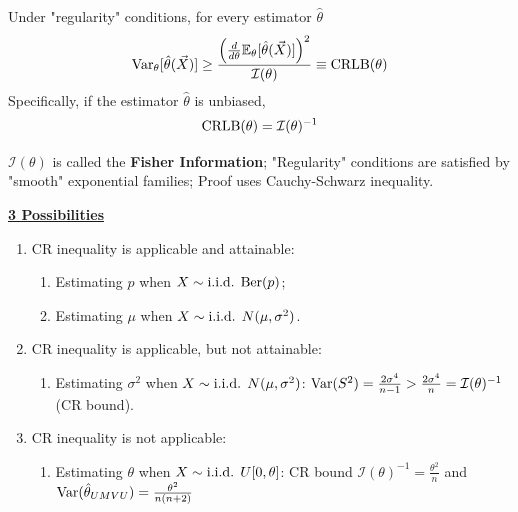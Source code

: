 \documentclass[11pt]{elegantbook}
\begin{document}
\begin{proposition}
    Under "regularity" conditions, for every estimator $\hat{\theta}$
    \begin{equation}
        \begin{aligned}
            \textnormal{Var}_\theta[\hat{\theta}(\vec{X})]\geq \frac{\left(\frac{d}{d\theta}\mathbb{E}_\theta[\hat{\theta}(\vec{X})]\right)^2}{\mathcal{I}(\theta)}\equiv \textnormal{CRLB}(\theta)
        \end{aligned}
        \nonumber
    \end{equation}
    Specifically, if the estimator $\hat{\theta}$ is unbiased, $$\textnormal{CRLB}(\theta)=\mathcal{I}(\theta)^{-1}$$
\end{proposition}
\begin{remark}
    $\mathcal{I}(\theta)$ is called the \textbf{Fisher Information}; "Regularity" conditions are satisfied by "smooth" exponential families; Proof uses Cauchy-Schwarz inequality.
\end{remark}
\textbf{\underline{3 Possibilities}}
\begin{enumerate}[(1).]
    \item CR inequality is applicable and attainable:
    \begin{enumerate}
        \item Estimating $p$ when $X\sim \textnormal{i.i.d. Ber}(p)$;
        \item Estimating $\mu$ when $X\sim \textnormal{i.i.d. } N(\mu,\sigma^2)$.
    \end{enumerate}
    \item CR inequality is applicable, but not attainable:
    \begin{enumerate}
        \item Estimating $\sigma^2$ when $X\sim \textnormal{i.i.d. } N(\mu,\sigma^2)$: $\textnormal{Var}(S^2)=\frac{2\sigma^4}{n-1}>\frac{2\sigma^4}{n}=\mathcal{I}(\theta)^{-1}$ (CR bound).
    \end{enumerate}
    \item CR inequality is not applicable:
    \begin{enumerate}
        \item Estimating $\theta$ when $X\sim \textnormal{i.i.d. }U[0,\theta]$: CR bound $\mathcal{I}(\theta)^{-1}=\frac{\theta^2}{n}$ and $\textnormal{Var}(\hat{\theta}_{UMVU})=\frac{\theta^2}{n(n+2)}$
    \end{enumerate}
\end{enumerate}
\end{document}

